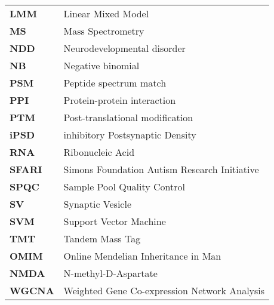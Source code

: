 \begin{tabular}{ >{\bfseries}l l }
	LMM 	 &  Linear Mixed Model \\
	MS 	 &  Mass Spectrometry \\
	NDD      &  Neurodevelopmental disorder \\
	NB 	 &  Negative binomial \\
	PSM	 &  Peptide spectrum match \\
	PPI 	 &  Protein-protein interaction \\
	PTM	 &  Post-translational modification \\
	iPSD	 &  inhibitory Postsynaptic Density \\
	RNA      &  Ribonucleic Acid \\
	SFARI    &  Simons Foundation Autism Research Initiative \\
	SPQC     &  Sample Pool Quality Control \\
	SV 	 &  Synaptic Vesicle \\
	SVM      &  Support Vector Machine \\
	TMT 	 &  Tandem Mass Tag \\
	OMIM     &  Online Mendelian Inheritance in Man \\
	NMDA 	 &  N-methyl-D-Aspartate \\
	WGCNA 	 &  Weighted Gene Co-expression Network Analysis \\
\end{tabular}

